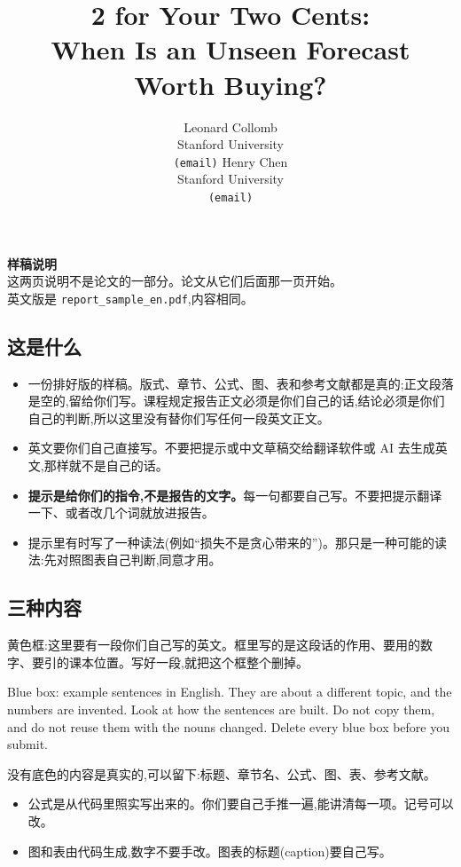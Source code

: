 \documentclass{article}
\title{2\textcent{} for Your Two Cents:\\ When Is an Unseen Forecast Worth Buying?}
\author{%
  Leonard Collomb\\ Stanford University\\ \texttt{(email)}
  \And
  Henry Chen\\ Stanford University\\ \texttt{(email)}}
\newif\ifnotes
\newenvironment{pts}{\begin{itemize}[nosep,leftmargin=1.15em,topsep=1pt]}{\end{itemize}}
\begin{document}
\ifnotes
\pagestyle{empty}
\begingroup\small
\begin{center}
{\Large\bfseries 样稿说明}\\[3pt]
{\small 这两页说明不是论文的一部分。论文从它们后面那一页开始。\\
英文版是 \texttt{report\_sample\_en.pdf},内容相同。}
\end{center}

\subsection*{这是什么}
\begin{pts}
\item 一份排好版的样稿。版式、章节、公式、图、表和参考文献都是真的;正文段落是空的,留给你们写。课程规定报告正文必须是你们自己的话,结论必须是你们自己的判断,所以这里没有替你们写任何一段英文正文。
\item 英文要你们自己直接写。不要把提示或中文草稿交给翻译软件或 AI 去生成英文,那样就不是自己的话。
\item \textbf{提示是给你们的指令,不是报告的文字。}每一句都要自己写。不要把提示翻译一下、或者改几个词就放进报告。
\item 提示里有时写了一种读法(例如``损失不是贪心带来的'')。那只是一种可能的读法:先对照图表自己判断,同意才用。
\end{pts}

\subsection*{三种内容}
\begin{note}
黄色框:这里要有一段你们自己写的英文。框里写的是这段话的作用、要用的数字、要引的课本位置。写好一段,就把这个框整个删掉。
\end{note}
\begin{model}
Blue box: example sentences in English. They are about a different topic, and the numbers are invented. Look at how the sentences are built. Do not copy them, and do not reuse them with the nouns changed. Delete every blue box before you submit.
\end{model}
没有底色的内容是真实的,可以留下:标题、章节名、公式、图、表、参考文献。
\begin{pts}
\item 公式是从代码里照实写出来的。你们要自己手推一遍,能讲清每一项。记号可以改。
\item 图和表由代码生成,数字不要手改。图表的标题(caption)要自己写。
\end{pts}
\end{document}
